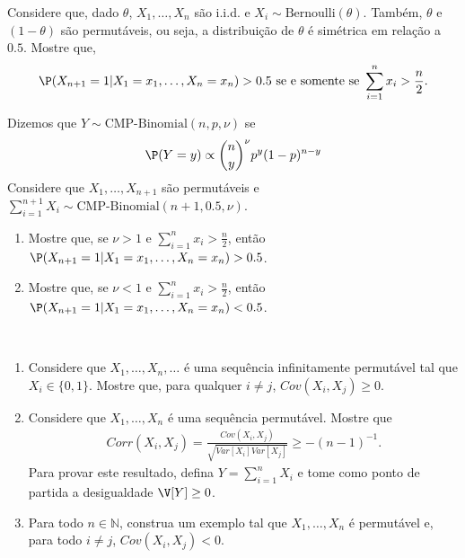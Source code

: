 \begin{exercise}
 Considere que, dado $\theta$,
 $X_{1},\ldots,X_{n}$ são i.i.d. e 
 $X_{i} \sim \text{Bernoulli}(\theta)$.
 Também, $\theta$ e $(1-\theta)$ são permutáveis,
 ou seja, a distribuição de $\theta$ é
 simétrica em relação a $0.5$.
 Mostre que,
 \begin{align*}
  \P(X_{n+1}=1|X_{1}=x_{1},\ldots,X_{n}=x_{n}) > 0.5
  \text{ se e somente se }
  \sum_{i=1}^{n}{x_i} > \frac{n}{2}.
 \end{align*}
\end{exercise}

\begin{exercise}
 Dizemos que $Y \sim \text{CMP-Binomial}(n,p,\nu)$ 
 \citep{Kadane2016} se
 \begin{align*}
  \P(Y=y) \propto {n \choose y}^{\nu}p^{y}(1-p)^{n-y}
 \end{align*}
 Considere que $X_{1},\ldots,X_{n+1}$ são permutáveis e
 $\sum_{i=1}^{n+1}{X_{i}} \sim \text{CMP-Binomial}(n+1,0.5,\nu)$.
 \begin{enumerate}[label=(\alph*)]
  \item Mostre que, se $\nu > 1$ e
  $\sum_{i=1}^{n}{x_i} > \frac{n}{2}$, então
  $\P(X_{n+1}=1|X_{1}=x_{1},\ldots,X_{n}=x_{n}) > 0.5$.
  \item Mostre que, se $\nu < 1$ e
  $\sum_{i=1}^{n}{x_i} > \frac{n}{2}$, então
  $\P(X_{n+1}=1|X_{1}=x_{1},\ldots,X_{n}=x_{n}) < 0.5$.
 \end{enumerate}
\end{exercise}

\begin{exercise} \
 \begin{enumerate}[label=(\alph*)]
  \item Considere que $X_{1},\ldots,X_{n},\ldots$ é
  uma sequência infinitamente permutável tal que
  $X_{i} \in \{0,1\}$.
  Mostre que, para qualquer $i \neq j$,
  $Cov(X_{i},X_{j}) \geq 0$.
  
  \item Considere que $X_{1},\ldots,X_{n}$ é
  uma sequência permutável. Mostre que
  \begin{align*}
   Corr(X_{i},X_{j}) 
   =\frac{Cov(X_{i},X_{j})}
   {\sqrt{Var[X_{i}]Var[X_{j}]}} \geq -(n-1)^{-1}.
  \end{align*}
  Para provar este resultado,
  defina $Y = \sum_{i=1}^{n}{X_{i}}$ e
  tome como ponto de partida a desigualdade
  $\V[Y] \geq 0$.
	
  \item Para todo $n \in \mathbb{N}$, 
  construa um exemplo tal que
  $X_{1},\ldots,X_{n}$ é permutável e,
  para todo $i \neq j$, $Cov(X_{i},X_{j}) < 0$.
 \end{enumerate}
\end{exercise}

